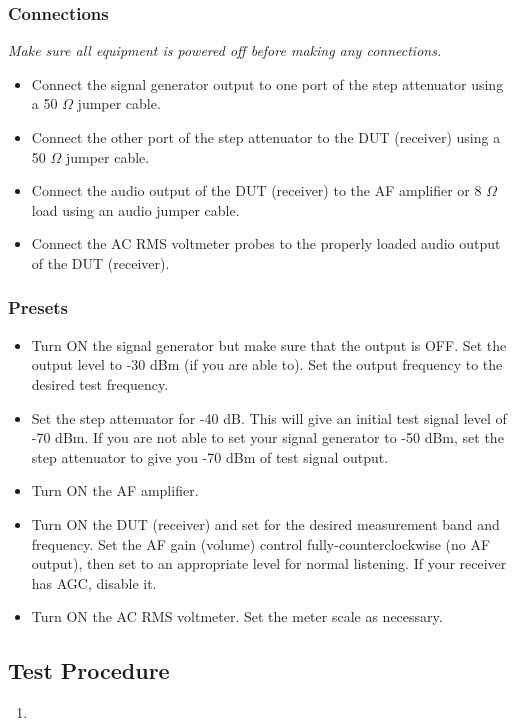 \documentclass[10pt,letterpaper]{book}
\begin{document}
\subsubsection*{Connections}
\emph{Make sure all equipment is powered off before making any connections.}
\begin{itemize}
	\item Connect the signal generator output to one port of the step attenuator using a 50 $\Omega$ jumper cable.
	\item Connect the other port of the step attenuator to the DUT (receiver) using a 50 $\Omega$ jumper cable.
	\item Connect the audio output of the DUT (receiver) to the AF amplifier or 8 $\Omega$ load using an audio jumper cable.
	\item Connect the AC RMS voltmeter probes to the properly loaded audio output of the DUT (receiver).
\end{itemize}
\subsubsection*{Presets}
\begin{itemize}
	\item Turn ON the signal generator but make sure that the output is OFF. Set the output level to -30 dBm (if you are able to). Set the output frequency to the desired test frequency.
	\item Set the step attenuator for -40 dB. This will give an initial test signal level of -70 dBm. If you are not able to set your signal generator to -50 dBm, set the step attenuator to give you -70 dBm of test signal output.
	\item Turn ON the AF amplifier.
	\item Turn ON the DUT (receiver) and set for the desired measurement band and frequency. Set the AF gain (volume) control fully-counterclockwise (no AF output), then set to an appropriate level for normal listening. If your receiver has AGC, disable it.
	\item Turn ON the AC RMS voltmeter. Set the meter scale as necessary.
\end{itemize}
\subsection*{Test Procedure}
\begin{enumerate}
	\item  
\end{enumerate}
\end{document}
